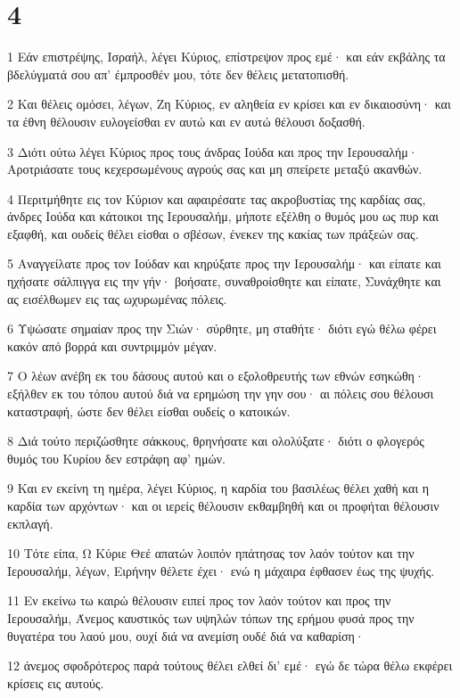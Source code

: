 \chapter{4}

\par 1 Εάν επιστρέψης, Ισραήλ, λέγει Κύριος, επίστρεψον προς εμέ· και εάν εκβάλης τα βδελύγματά σου απ' έμπροσθέν μου, τότε δεν θέλεις μετατοπισθή.
\par 2 Και θέλεις ομόσει, λέγων, Ζη Κύριος, εν αληθεία εν κρίσει και εν δικαιοσύνη· και τα έθνη θέλουσιν ευλογείσθαι εν αυτώ και εν αυτώ θέλουσι δοξασθή.
\par 3 Διότι ούτω λέγει Κύριος προς τους άνδρας Ιούδα και προς την Ιερουσαλήμ· Αροτριάσατε τους κεχερσωμένους αγρούς σας και μη σπείρετε μεταξύ ακανθών.
\par 4 Περιτμήθητε εις τον Κύριον και αφαιρέσατε τας ακροβυστίας της καρδίας σας, άνδρες Ιούδα και κάτοικοι της Ιερουσαλήμ, μήποτε εξέλθη ο θυμός μου ως πυρ και εξαφθή, και ουδείς θέλει είσθαι ο σβέσων, ένεκεν της κακίας των πράξεών σας.
\par 5 Αναγγείλατε προς τον Ιούδαν και κηρύξατε προς την Ιερουσαλήμ· και είπατε και ηχήσατε σάλπιγγα εις την γήν· βοήσατε, συναθροίσθητε και είπατε, Συνάχθητε και ας εισέλθωμεν εις τας ωχυρωμένας πόλεις.
\par 6 Υψώσατε σημαίαν προς την Σιών· σύρθητε, μη σταθήτε· διότι εγώ θέλω φέρει κακόν από βορρά και συντριμμόν μέγαν.
\par 7 Ο λέων ανέβη εκ του δάσους αυτού και ο εξολοθρευτής των εθνών εσηκώθη· εξήλθεν εκ του τόπου αυτού διά να ερημώση την γην σου· αι πόλεις σου θέλουσι καταστραφή, ώστε δεν θέλει είσθαι ουδείς ο κατοικών.
\par 8 Διά τούτο περιζώσθητε σάκκους, θρηνήσατε και ολολύξατε· διότι ο φλογερός θυμός του Κυρίου δεν εστράφη αφ' ημών.
\par 9 Και εν εκείνη τη ημέρα, λέγει Κύριος, η καρδία του βασιλέως θέλει χαθή και η καρδία των αρχόντων· και οι ιερείς θέλουσιν εκθαμβηθή και οι προφήται θέλουσιν εκπλαγή.
\par 10 Τότε είπα, Ω Κύριε Θεέ απατών λοιπόν ηπάτησας τον λαόν τούτον και την Ιερουσαλήμ, λέγων, Ειρήνην θέλετε έχει· ενώ η μάχαιρα έφθασεν έως της ψυχής.
\par 11 Εν εκείνω τω καιρώ θέλουσιν ειπεί προς τον λαόν τούτον και προς την Ιερουσαλήμ, Άνεμος καυστικός των υψηλών τόπων της ερήμου φυσά προς την θυγατέρα του λαού μου, ουχί διά να ανεμίση ουδέ διά να καθαρίση·
\par 12 άνεμος σφοδρότερος παρά τούτους θέλει ελθεί δι' εμέ· εγώ δε τώρα θέλω εκφέρει κρίσεις εις αυτούς.
